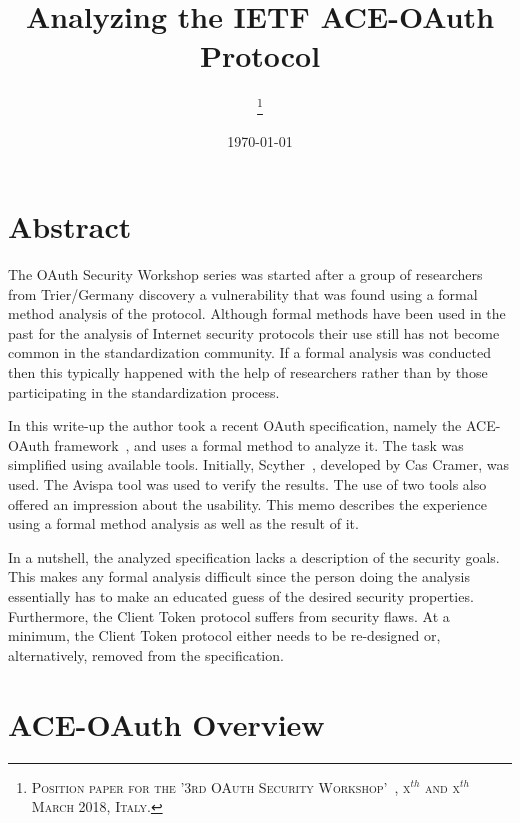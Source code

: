 \documentclass[peerreview, a4paper, 7pt]{IEEEtran}
\begin{document}
\title{Analyzing the IETF ACE-OAuth Protocol}

\author{
\thanks{\textsc{Position paper for the '3rd OAuth Security Workshop'~\cite{OSW2018}, x$^{th}$ and x$^{th}$ March 2018, Italy.}}
}

\date{\today}

\maketitle


\section{Abstract}

The OAuth Security Workshop series was started after a group of researchers from Trier/Germany discovery a vulnerability that was found using a formal method analysis of the protocol. Although formal methods have been used in the past for the analysis of Internet security protocols their use still has not become common in the standardization community. If a formal analysis was conducted then this typically happened with the help of researchers rather than by those participating in the standardization process.

In this write-up the author took a recent OAuth specification, namely the ACE-OAuth framework~\cite{draft-ietf-ace-oauth-authz-09}, and uses a formal method to analyze it. The task was simplified using available tools. Initially, Scyther~\cite{Scyther}, developed by Cas Cramer, was used. The Avispa tool was used to verify the results. The use of two tools also offered an impression about the usability. This memo describes the experience using a formal method analysis as well as the result of it. 

In a nutshell, the analyzed specification lacks a description of the security goals. This makes any formal analysis difficult since the person doing the analysis essentially has to make an educated guess of the desired security properties. Furthermore, the Client Token protocol suffers from security flaws. At a minimum, the Client Token protocol either needs to be re-designed or, alternatively, removed from the specification.

\section{ACE-OAuth Overview}
\label{lwm2m}
\end{document}
